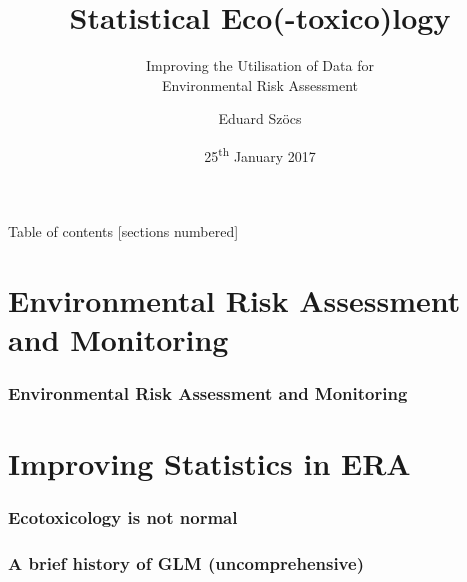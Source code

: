 \documentclass[10pt
	]{beamer}
\title{Statistical Eco(-toxico)logy}
\subtitle{Improving the Utilisation of Data for\\Environmental Risk Assessment}
\date{25\textsuperscript{th} January 2017}
\author{Eduard Sz\"{o}cs}
\begin{document}
\maketitle

\begin{frame}{Table of contents}
  [sections numbered]
  \tableofcontents[hideallsubsections]
\end{frame}

\section{Environmental Risk Assessment and Monitoring}

\begin{frame}
\frametitle{Environmental Risk Assessment and Monitoring}
 \resizebox{11.5cm}{!}{%
				
				}
\end{frame}


\section{Improving Statistics in ERA}


\begin{frame}
\frametitle{Ecotoxicology is not normal}

\end{frame}



\begin{frame}
\frametitle{A brief history of GLM (uncomprehensive)}

\end{frame}
\end{document}
